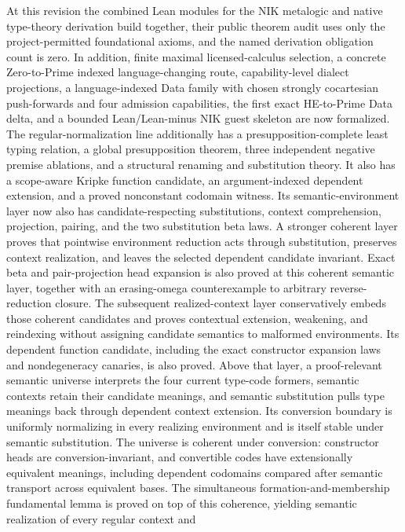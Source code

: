 \documentclass[11pt]{article}
\newcommand{\NIK}{NIK}
\begin{document}
At this revision the combined Lean modules for the \NIK{} metalogic and native
type-theory derivation build together, their public theorem audit uses only the
project-permitted foundational axioms, and the named derivation obligation count is
zero.  In addition, finite maximal licensed-calculus selection, a concrete
Zero-to-Prime indexed language-changing route, capability-level dialect
projections, a language-indexed Data family with chosen strongly cocartesian
push-forwards and four admission capabilities,
the first exact HE-to-Prime Data delta, and a bounded Lean/Lean-minus NIK guest
skeleton are now formalized.  The regular-normalization line additionally has a
presupposition-complete least typing relation, a global presupposition theorem,
three independent negative premise ablations, and a structural renaming and
substitution theory.  It also has a
scope-aware Kripke function candidate, an argument-indexed dependent extension,
and a proved nonconstant codomain witness.  Its semantic-environment layer now
also has candidate-respecting substitutions, context comprehension, projection,
pairing, and the two substitution beta laws.  A stronger coherent layer proves
that pointwise environment reduction acts through substitution, preserves
context realization, and leaves the selected dependent candidate invariant.
Exact beta and pair-projection head expansion is also proved at this coherent
semantic layer, together with an erasing-omega counterexample to arbitrary
reverse-reduction closure.
The subsequent realized-context layer conservatively embeds those coherent
candidates and proves contextual extension, weakening, and reindexing without
assigning candidate semantics to malformed environments.  Its dependent
function candidate, including the exact constructor expansion laws and
nondegeneracy canaries, is also proved.
Above that layer, a proof-relevant semantic universe interprets the four current
type-code formers, semantic contexts retain their candidate meanings, and
semantic substitution pulls type meanings back through dependent context
extension.  Its conversion boundary is uniformly normalizing in every realizing
environment and is itself stable under semantic substitution.  The universe is
coherent under conversion: constructor heads are conversion-invariant, and
convertible codes have extensionally equivalent meanings, including dependent
codomains compared after semantic transport across equivalent bases.  The
simultaneous formation-and-membership fundamental lemma is proved on top of
this coherence, yielding semantic realization of every regular context and
\end{document}
